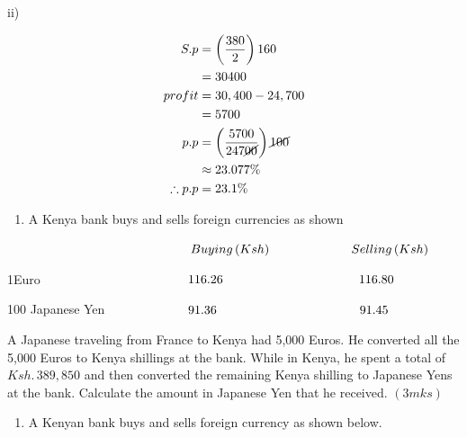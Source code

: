 \documentclass[
  a4paperpaper,
]{scrbook}
\providecommand{\tightlist}{%
  \setlength{\itemsep}{0pt}\setlength{\parskip}{0pt}}\usepackage{longtable,booktabs,array}
\begin{document}
\begin{tcolorbox}
ii)

\begin{align*}
S.p&=\left(\frac{380}{2}\right)160\\&=30400\\
profit&=30,400-24,700\\&=5700\\
p.p&=\left(\frac{5700}{247\cancel{00}}\right)\cancel{100}\\ &\approx23.077\%\\
\therefore p.p&= 23.1\%
\end{align*}

\end{tcolorbox}

\begin{tcolorbox}[enhanced jigsaw, left=2mm, colframe=quarto-callout-note-color-frame, toptitle=1mm, opacitybacktitle=0.6, rightrule=.15mm, colbacktitle=quarto-callout-note-color!10!white, colback=white, arc=.35mm, breakable, leftrule=.75mm, bottomtitle=1mm, bottomrule=.15mm, title=\textcolor{quarto-callout-note-color}{\faInfo}\hspace{0.5em}{Problems to solve}, titlerule=0mm, coltitle=black, toprule=.15mm, opacityback=0]

\begin{enumerate}
\def\labelenumi{\arabic{enumi}.}
\tightlist
\item
  A Kenya bank buys and sells foreign currencies as shown
\end{enumerate}

\(\hspace{5.1cm} Buying \,(Ksh) \hspace{2.3cm}Selling \,(Ksh)\)

1Euro \(\hspace{4cm} 116.26 \hspace{3.8cm} 116.80\)

100 Japanese Yen \(\hspace{2.2cm} 91.36 \hspace{4cm} 91.45\)

A Japanese traveling from France to Kenya had 5,000 Euros. He converted
all the 5,000 Euros to Kenya shillings at the bank. While in Kenya, he
spent a total of \(Ksh.\, 389,850\) and then converted the remaining
Kenya shilling to Japanese Yens at the bank. Calculate the amount in
Japanese Yen that he received. \hspace{9.1cm} \((3mks)\)

\begin{enumerate}
\def\labelenumi{\arabic{enumi}.}
\setcounter{enumi}{1}
\tightlist
\item
  A Kenyan bank buys and sells foreign currency as shown below.
\end{enumerate}


\end{tcolorbox}
\end{document}
